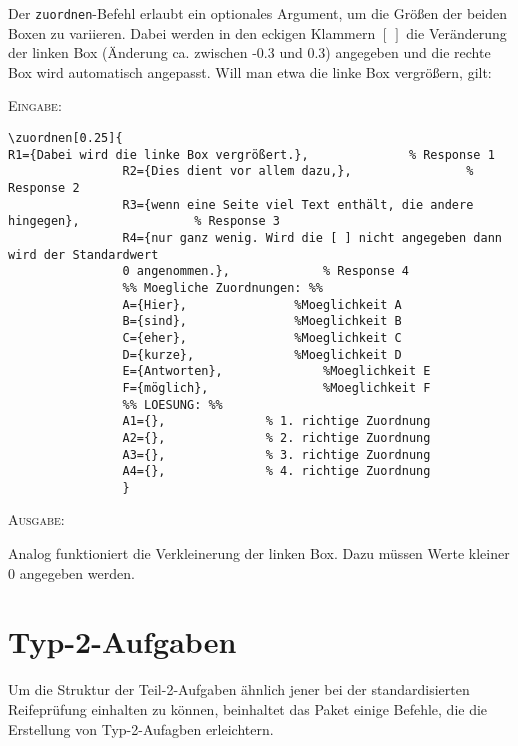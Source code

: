 \documentclass[a4paper,12pt]{article}
\begin{document}
Der \texttt{zuordnen}-Befehl erlaubt ein optionales Argument, um die Größen der beiden Boxen zu variieren. Dabei werden in den eckigen Klammern $[~]$ die Veränderung der linken Box (Änderung ca. zwischen -0.3 und 0.3) angegeben und die rechte Box wird automatisch angepasst. Will man etwa die linke Box vergrößern, gilt:  
 
\textsc{Eingabe:}
\begin{small}
\begin{verbatim}
\zuordnen[0.25]{
R1={Dabei wird die linke Box vergrößert.},				% Response 1
				R2={Dies dient vor allem dazu,},				% Response 2
				R3={wenn eine Seite viel Text enthält, die andere hingegen},				% Response 3
				R4={nur ganz wenig. Wird die [ ] nicht angegeben dann wird der Standardwert
				0 angenommen.},				% Response 4
				%% Moegliche Zuordnungen: %%
				A={Hier}, 				%Moeglichkeit A  
				B={sind}, 				%Moeglichkeit B  
				C={eher}, 				%Moeglichkeit C  
				D={kurze}, 				%Moeglichkeit D  
				E={Antworten}, 				%Moeglichkeit E  
				F={möglich}, 				%Moeglichkeit F  
				%% LOESUNG: %%
				A1={},				% 1. richtige Zuordnung
				A2={},				% 2. richtige Zuordnung
				A3={},				% 3. richtige Zuordnung
				A4={},				% 4. richtige Zuordnung
				}
\end{verbatim}



\textsc{Ausgabe:}

\end{small}

Analog funktioniert die Verkleinerung der linken Box. Dazu müssen Werte kleiner 0 angegeben werden.


\section{Typ-2-Aufgaben}
Um die Struktur der Teil-2-Aufgaben ähnlich jener bei der standardisierten Reifeprüfung einhalten zu können, beinhaltet das Paket einige Befehle, die die Erstellung von Typ-2-Aufagben erleichtern.
\end{document}
